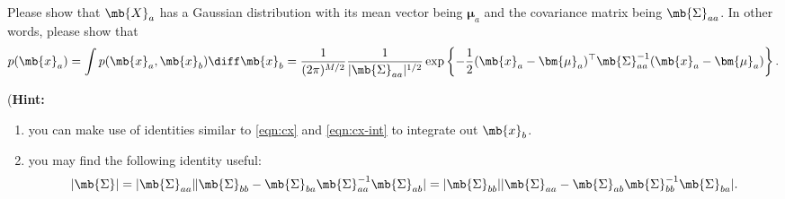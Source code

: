 \begin{exercise}
\begin{enumerate}
            Please show that $\mb{X}_a$ has a Gaussian distribution with its mean vector being $\bm{\mu}_a$ and the covariance matrix being $\mb{\Sigma}_{aa}$. In other words, please show that
            \begin{align*}
                p(\mb{x}_a)=\int p(\mb{x}_a,\mb{x}_b)\diff\mb{x}_b=\frac{1}{(2\pi)^{M/2}}\frac{1}{|\mb{\Sigma}_{aa}|^{1/2}}\exp\left\{-\frac{1}{2}(\mb{x}_a-\bm{\mu}_a)^{\top}\mb{\Sigma}_{aa}^{-1}(\mb{x}_a-\bm{\mu}_a)\right\}.
            \end{align*}
            
            (\textbf{Hint:}
            \begin{enumerate}
                \item you can make use of identities similar to \eqref{eqn:cx} and \eqref{eqn:cx-int} to integrate out $\mb{x}_b$.
                \item you may find the following identity useful:
                    \begin{align*}
                        |\mb{\Sigma}|=|\mb{\Sigma}_{aa}\|\mb{\Sigma}_{bb}-\mb{\Sigma}_{ba}\mb{\Sigma}_{aa}^{-1}\mb{\Sigma}_{ab}|=|\mb{\Sigma}_{bb}||\mb{\Sigma}_{aa}-\mb{\Sigma}_{ab}\mb{\Sigma}_{bb}^{-1}\mb{\Sigma}_{ba}|.
                    \end{align*}
            \end{enumerate}
            

\end{enumerate}
\end{exercise}
